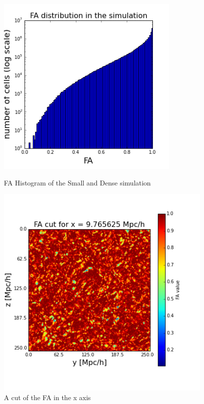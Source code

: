 \documentclass[12pt]{article}
\begin{document}
\begin{figure}[ht]
\centering
\begin{minipage}{.5\textwidth}
  \centering
  \includegraphics[width=0.8\textwidth]{simulation/FA_hist_sim.png}
  \caption{FA Histogram of the Small and Dense simulation}
\label{fg:hist_FA}
\end{minipage}%
\begin{minipage}{.5\textwidth}
  \centering
  \includegraphics[width=0.95\textwidth]{simulation/FA_cut_i_10.png}
  \caption{A cut of the FA in the x axis}
\label{fg:cut_FA}
\end{minipage}
\end{figure}
\FloatBarrier
\end{document}
